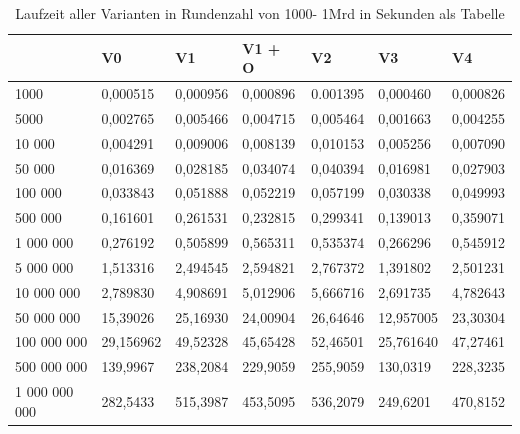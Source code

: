 \documentclass[course=asp]{aspdoc}
\begin{document}
\begin{table}[H]
\centering
    \begin{tabular}{|l|l|l|l|l|l|l|}
     \hline 	       & V0 & V1 & V1 + O & V2 & V3 & V4  \\
     \hline 1000 & 0,000515 & 0,000956 & 0,000896 & 0.001395 & 0,000460  & 0,000826  \\
	 \hline 5000 & 0,002765 & 0,005466 & 0,004715 & 0,005464 & 0,001663  & 0,004255  \\
	 \hline 10 000 & 0,004291 & 0,009006 & 0,008139 & 0,010153 & 0,005256  &  0,007090 \\
	 \hline 50 000 & 0,016369 & 0,028185 & 0,034074 & 0,040394 & 0,016981  & 0,027903 \\
     \hline 100 000 & 0,033843 & 0,051888 & 0,052219 & 0,057199 & 0,030338  & 0,049993 \\
	 \hline 500 000 & 0,161601 & 0,261531 & 0,232815 & 0,299341 & 0,139013 & 0,359071\\
	 \hline 1 000 000 & 0,276192 & 0,505899 & 0,565311 & 0,535374 & 0,266296  & 0,545912 \\
	 \hline 5 000 000 & 1,513316 & 2,494545 & 2,594821 & 2,767372 & 1,391802  & 2,501231\\
     \hline 10 000 000 & 2,789830 & 4,908691 & 5,012906 & 5,666716 & 2,691735  & 4,782643 \\
	 \hline 50 000 000 & 15,39026 & 25,16930 & 24,00904 & 26,64646 & 12,957005  & 23,30304  \\
	 \hline 100 000 000 & 29,156962 & 49,52328 & 45,65428 & 52,46501 & 25,761640 & 47,27461 \\
	 \hline 500 000 000 & 139,9967 & 238,2084 & 229,9059 & 255,9059 & 130,0319 & 228,3235 \\
     \hline 1 000 000 000 & 282,5433 & 515,3987 & 453,5095 & 536,2079 & 249,6201  & 470,8152 \\
	\hline
    \end{tabular}
    \caption{Laufzeit aller Varianten in Rundenzahl von 1000- 1Mrd in Sekunden als Tabelle}
\end{table}
\end{document}
